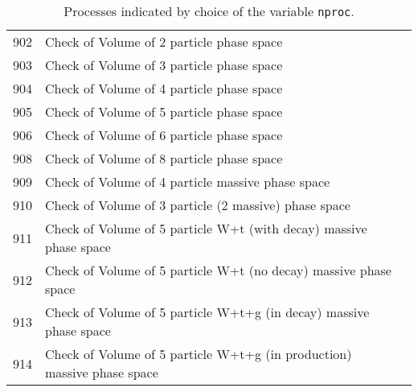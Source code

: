 \begin{table}
\begin{center}
\begin{tabular}{|l|l|l|}
\hline
902 & Check of Volume of 2 particle phase space & \\  
903 & Check of Volume of 3 particle phase space & \\  
904 & Check of Volume of 4 particle phase space & \\  
905 & Check of Volume of 5 particle phase space & \\  
906 & Check of Volume of 6 particle phase space & \\  
908 & Check of Volume of 8 particle phase space & \\  
909 & Check of Volume of 4 particle massive phase space & \\  
910 & Check of Volume of 3 particle (2 massive) phase space & \\  
911 & Check of Volume of 5 particle W+t (with decay) massive phase space & \\  
912 & Check of Volume of 5 particle W+t (no decay) massive phase space & \\  
913 & Check of Volume of 5 particle W+t+g (in decay) massive phase space & \\  
914 & Check of Volume of 5 particle W+t+g (in production) massive phase space & \\  
\hline 
\hline
\end{tabular}
\caption{Processes indicated by choice of the variable {\tt nproc}.\label{nproctable}}
\end{center}
\end{table}
